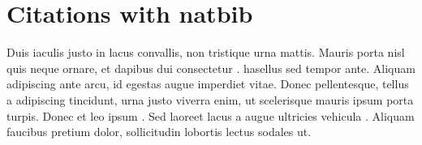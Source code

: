 \documentclass[10pt]{article}
\begin{document}
\section{Citations with natbib}

Duis iaculis justo in lacus convallis, non tristique urna mattis. Mauris porta nisl quis neque ornare, et dapibus dui consectetur \cite{Halle1997}. \citet{labov1969} hasellus sed tempor ante. Aliquam adipiscing ante arcu, id egestas augue imperdiet vitae. Donec pellentesque, tellus a adipiscing tincidunt, urna justo viverra enim, ut scelerisque mauris ipsum porta turpis. Donec et leo ipsum \cite{chomsky1998,chomsky2001}. Sed laoreet lacus a augue ultricies vehicula \cite[cf.][p.~402]{mcfadden2004}. Aliquam faucibus pretium dolor, sollicitudin lobortis lectus sodales ut.



\end{document}
